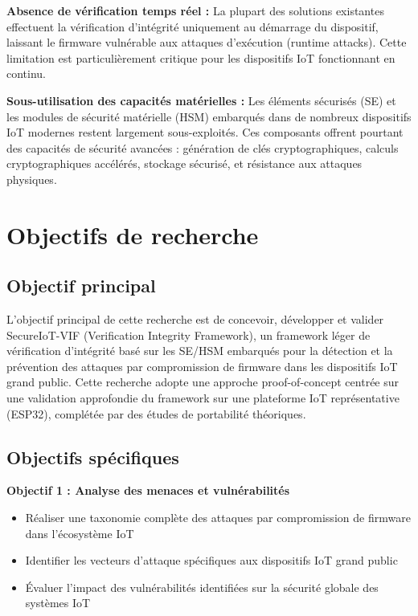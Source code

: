 \textbf{Absence de vérification temps réel :} La plupart des solutions existantes effectuent la vérification d'intégrité uniquement au démarrage du dispositif, laissant le firmware vulnérable aux attaques d'exécution (runtime attacks). Cette limitation est particulièrement critique pour les dispositifs IoT fonctionnant en continu.

\textbf{Sous-utilisation des capacités matérielles :} Les éléments sécurisés (\ac{SE}) et les modules de sécurité matérielle (\ac{HSM}) embarqués dans de nombreux dispositifs IoT modernes restent largement sous-exploités. Ces composants offrent pourtant des capacités de sécurité avancées : génération de clés cryptographiques, calculs cryptographiques accélérés, stockage sécurisé, et résistance aux attaques physiques.

\section{Objectifs de recherche}

\subsection{Objectif principal}

L'objectif principal de cette recherche est de concevoir, développer et valider SecureIoT-VIF (Verification Integrity Framework), un framework léger de vérification d'intégrité basé sur les \ac{SE}/\ac{HSM} embarqués pour la détection et la prévention des attaques par compromission de firmware dans les dispositifs IoT grand public. Cette recherche adopte une approche proof-of-concept centrée sur une validation approfondie du framework sur une plateforme IoT représentative (ESP32), complétée par des études de portabilité théoriques.

\subsection{Objectifs spécifiques}

\textbf{Objectif 1 : Analyse des menaces et vulnérabilités}
\begin{itemize}
    \item Réaliser une taxonomie complète des attaques par compromission de firmware dans l'écosystème IoT
    \item Identifier les vecteurs d'attaque spécifiques aux dispositifs IoT grand public
    \item Évaluer l'impact des vulnérabilités identifiées sur la sécurité globale des systèmes IoT
\end{itemize}

